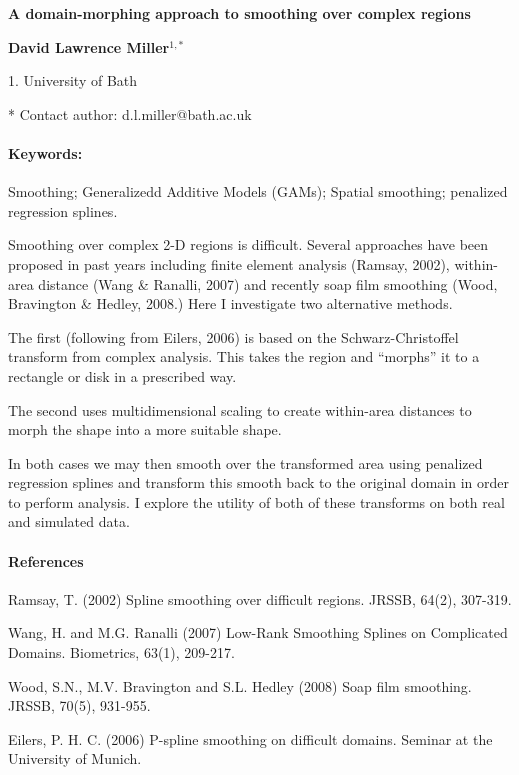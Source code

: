 \documentclass[10pt]{article}
\renewcommand{\title}[1]{\begin{center}{\bf \LARGE #1}\end{center}}
\newcommand{\keywords}{\paragraph{Keywords:}}
\begin{document}
\pagestyle{empty}

\title{A domain-morphing approach to smoothing over complex regions}

\begin{center}
  {\bf David Lawrence Miller$^{1,*}$}
\end{center}

\begin{affiliations}
1. University of Bath\par
* Contact author: d.l.miller@bath.ac.uk
\end{affiliations}

\keywords Smoothing; Generalizedd Additive Models (GAMs); Spatial smoothing; penalized regression splines.

\vskip 0.8cm

Smoothing over complex 2-D regions is difficult. Several approaches have been proposed in past years including finite element analysis (Ramsay, 2002), within-area distance (Wang \& Ranalli, 2007) and recently soap film smoothing (Wood, Bravington \& Hedley, 2008.) Here I investigate two alternative methods.

The first (following from Eilers, 2006) is based on the Schwarz-Christoffel transform from complex analysis. This takes the region and ``morphs'' it to a rectangle or disk in a prescribed way. 

The second uses multidimensional scaling to create within-area distances to morph the shape into a more suitable shape.

In both cases we may then smooth over the transformed area using penalized regression splines and transform this smooth back to the original domain in order to perform analysis. I explore the utility of both of these transforms on both real and simulated data.

\paragraph{References}
\begin{description}
\item Ramsay, T. (2002) Spline smoothing over difficult regions. JRSSB, 64(2), 307-319.
\item Wang, H. and M.G. Ranalli (2007) Low-Rank Smoothing Splines on Complicated Domains. Biometrics, 63(1), 209-217.
\item Wood, S.N., M.V. Bravington and S.L. Hedley (2008) Soap film smoothing. JRSSB, 70(5), 931-955.
\item Eilers, P. H. C. (2006) P-spline smoothing on difficult domains. Seminar at the University of Munich.

\end{description}

%
%
\end{document}
